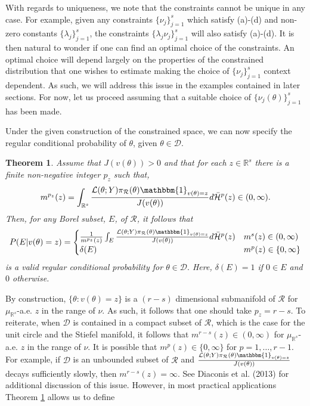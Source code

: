 \documentclass[10pt,fleqn]{article}
\newtheorem{theorem}{Theorem}
\DeclareMathOperator{\1}{\mathbbm{1}}
\begin{document}
With regards to uniqueness, we note that the constraints cannot be unique in any case.  For example, given any constraints $\{\nu_{j}\}_{j=1}^s$ which satisfy (a)-(d) and non-zero constants $\{\lambda_j\}_{j=1}^s$, the constraints $\{\lambda_j \nu_j\}_{j=1}^s$ will also satisfy (a)-(d). It is then natural to wonder if one can find an optimal choice of the  constraints. An optimal choice will depend largely on the properties of the constrained distribution that one wishes to estimate making the choice of $\{\nu_j\}_{j=1}^s$ context dependent.  As such, we will address this issue in the examples contained in later sections. For now, let us proceed assuming that a suitable choice of $\{\nu_j(\theta)\}_{j=1}^s$ has been made.

Under the given construction of the constrained space, we can now specify the regular conditional probability of $\theta$, given $\theta \in \mathcal{D}.$
\begin{theorem}\cite{[diaconis2013manifold]}
\label{THM:RCP_construction}
Assume that $J(v(\theta)) > 0$ and that for each $z\in\mathbb{R}^s$ there is a finite non-negative integer $p_z$ such that,  $$m^{p_z}(z) = \int_{\mathbb{R}^ {s}} \frac{\mathcal{L}(\theta; Y) \pi_\mathcal{R}(\theta) \mathbbm{1}_{v(\theta)=z}}{J(v(\theta))} d\bar{\mathcal{H}}^{p}(z) \in (0,\infty).$$
Then, for any Borel subset, $E$, of $\mathcal{R}$, it follows that 
$$P(E|v(\theta) = z) = 
\begin{cases}
\frac{1}{m^{p_z}(z)} \int_E \frac{\mathcal{L}(\theta; Y) \pi_\mathcal{R}(\theta) \mathbbm{1}_{v(\theta)=z}}{J(v(\theta))} d\bar{\mathcal{H}}^{p}(z)  & m^s(z)\in (0,\infty)  \\
\delta (E) & m^p(z) \in \{0,\infty\}
\end{cases}$$
is a valid regular conditional probability for $\theta\in\mathcal{D}.$ Here, $\delta (E)=1$ if $0\in E$ and $0$ otherwise. 
\end{theorem}

By construction, $\{\theta:v(\theta)=z\}$ is a $(r-s)$ dimensional submanifold of $\mathcal{R}$ for $\mu_{\mathbb{R}^s}$-a.e. $z$ in the range of $\nu$. As such, it follows that one should take $p_z=r-s$.  To reiterate, when $\mathcal{D}$ is contained in a compact subset of $\mathcal{R}$, which is the case for the unit circle and the Stiefel manifold, it follows that $m^{r-s}(z)\in (0,\infty)$ for $\mu_{\mathbb{R}^s}$-a.e. $z$ in the range of $\nu.$ 
It is possible that $m^p(z)\in\{0,\infty\}$ for $p=1,\dots,r-1$.  For example, if $\mathcal{D}$ is an unbounded subset of $\mathcal{R}$ and $\frac{\mathcal{L}(\theta; Y) \pi_\mathcal{R}(\theta) \mathbbm{1}_{v(\theta)=z}}{J(v(\theta))}$ decays sufficiently slowly, then $m^{r-s}(z)=\infty.$ See Diaconis et al. (2013) for additional discussion of this issue. 
However, in most practical applications Theorem \ref{THM:RCP_construction} allows us to define 
\end{document}

